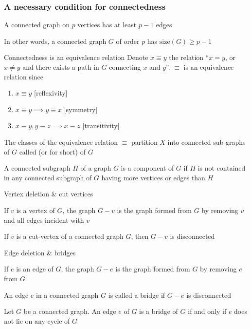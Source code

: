 \documentclass[aspectratio=43]{beamer}
\begin{document}
\begin{frame}\frametitle{A necessary condition for connectedness}
	\begin{theorem}
		A connected graph on $p$ vertices has at least $p-1$ edges
	\end{theorem}
	\vfill
	In other words, a connected graph $G$ of order $p$ has $\text{size}(G)\geq p-1$
\end{frame}

\begin{frame}{Connectedness is an equivalence relation}
	Denote $x\equiv y$ the relation  ``$x=y$, or $x\neq y$ and there exists a path in $G$ connecting $x$ and $y$''. $\equiv$ is an equivalence relation since
	\begin{enumerate}
		\item $x\equiv y$ \hfill[reflexivity]
		\item $x\equiv y\implies y\equiv x$ \hfill[symmetry]
		\item $x\equiv y, y\equiv z\implies x\equiv z$ \hfill[transitivity]
	\end{enumerate}
	\vfill
	\begin{definition}
		The classes of the equivalence relation $\equiv$ partition $X$ into connected sub-graphs of $G$ called  (or  for short) of $G$
	\end{definition}
	\vfill
	A connected subgraph $H$ of a graph $G$ is a component of $G$ if $H$ is not contained in any connected subgraph of $G$ having more vertices or edges than $H$
\end{frame}



\begin{frame}{Vertex deletion \& cut vertices}
\begin{definition}
If $v$ is a vertex of $G$, the graph $G-v$ is the graph formed from $G$ by removing $v$ and all edges incident with $v$
\end{definition}
\vfill
\begin{definition}
	If $v$ is a cut-vertex of a connected graph $G$, then $G-v$ is disconnected
\end{definition}
\end{frame}


\begin{frame}{Edge deletion \& bridges}
\begin{definition}
	If $e$ is an edge of $G$, the graph $G-e$ is the graph formed from $G$ by removing $e$ from $G$
\end{definition}
\vfill
\begin{definition}[{Bridge}]
An edge $e$ in a connected graph $G$ is called a bridge if $G-e$ is disconnected
\end{definition}
\vfill
\begin{theorem}
Let $G$ be a connected graph. An edge $e$ of $G$ is a bridge of $G$ if and only if $e$ does not lie on any cycle of $G$
\end{theorem}
\end{frame}
\end{document}
